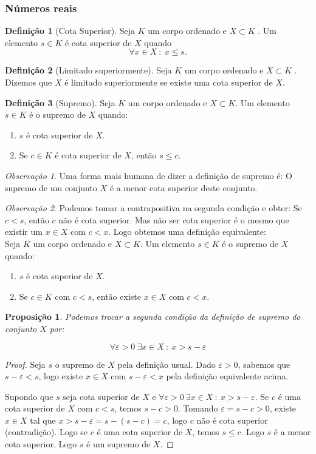 \documentclass{article}
\newtheorem{prop}{Proposição}[section]
\theoremstyle{theorem}
\theoremstyle{lemma}
\theoremstyle{definition}
\newtheorem{definicao}{Definição}[section]
\theoremstyle{remark}
\newtheorem{obs}{Observação}[section]
\begin{document}
   \subsubsection{Números reais}
\begin{definicao}[Cota Superior]
	Seja $K$ um corpo ordenado e $X\subset K$ . Um elemento $s\in K$ é cota superior de $X$ quando $$ \forall x\in X \: : \: x\leq s.$$
\end{definicao}
\begin{definicao}[Limitado superiormente]
	
	Seja $K$ um corpo ordenado e $X\subset K$ . Dizemos que $X$ é limitado superiormente se existe uma cota superior de $X$.
\end{definicao}
\begin{definicao}[Supremo]
	Seja $K$ um corpo ordenado e $X\subset K$. Um elemento $s\in K$ é o supremo de $X$ quando:
	\begin{enumerate}
		\item $s$ é cota superior de $X$.
		\item Se $c\in K$ é cota superior de $X$, então $s\leq c$.
	\end{enumerate}
\end{definicao}
\begin{obs}
	Uma forma mais humana de dizer a definição de supremo é: O supremo de um conjunto $X$ é a menor cota superior deste conjunto.
\end{obs}
\begin{obs}
	Podemos tomar a contrapositiva na segunda condição e obter: Se $c < s$, então $c$ não é cota superior. Mas não ser cota superior é o mesmo que existir um $x\in X$ com $c< x$. Logo obtemos uma definição equivalente:\\
	Seja $K$ um corpo ordenado e $X\subset K$. Um elemento $s\in K$ é o supremo de $X$ quando:
	\begin{enumerate}
		\item $s$ é cota superior de $X$.
		\item Se $c\in K$ com $c < s$, então existe $x\in X$ com  $c< x$.
	\end{enumerate}
\end{obs}
\begin{prop}
	Podemos trocar a segunda condição da definição de supremo do conjunto $X$ por:
	
	$$\forall \varepsilon>0 \: \exists x\in X \: : \: x > s- \varepsilon $$
\end{prop}
\begin{proof}
	Seja $s$  o supremo de $X$ pela definição usual. Dado $\varepsilon >0$, sabemos que $s - \varepsilon < s$, logo existe $x\in X$ com $s-\varepsilon < x$ pela definição equivalente acima.

	Supondo que $s$ seja cota superior de $X$ e $\forall \varepsilon>0 \: \exists x\in X \: : \: x > s- \varepsilon $. Se $c$ é uma cota superior de $X$ com $c < s$, temos $s - c > 0 $. Tomando $\varepsilon = s-c>0$, existe $x\in X$ tal que $x > s-\varepsilon = s-(s-c) = c$, logo $c$ não é cota superior (contradição). Logo se $c$ é uma cota superior de $X$, temos $s \leq c$. Logo $s$ é  a menor cota superior. Logo $s$ é um supremo de $X$.
\end{proof}
\end{document}
